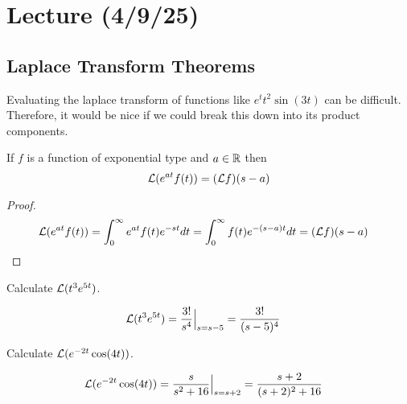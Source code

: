 \documentclass[notes]{subfiles}
\begin{document}
\setcounter{section}{18}
\section{Lecture (4/9/25)}

\subsection{Laplace Transform Theorems}
Evaluating the laplace transform of functions like $e^t t^2 \sin(3t)$ can be difficult. Therefore, it would be nice if we could break this down into its product components.

\begin{theorem} \label{first_translation_theorem}
    If $f$ is a function of exponential type and $a \in \mathbb{R}$ then
    \[
        \mathcal{L}(e^{at}f(t)) = (\mathcal{L} f)(s - a)
    \]
\end{theorem}
\begin{proof}
    \begin{align*}
        \mathcal{L}(e^{at}f(t))
        &= \int_0^\infty e^{at}f(t)e^{-st}dt
        = \int_0^\infty f(t)e^{-(s - a)t}dt
        = (\mathcal{L} f)(s - a)
    \end{align*}
\end{proof}

\begin{exercise}
    Calculate $\mathcal{L}(t^3e^{5t})$.
\end{exercise}
\begin{solution}
    \begin{align*}
        \mathcal{L}(t^3e^{5t})
        &= \frac{3!}{s^4}\Big|_{s = s - 5}
        = \frac{3!}{(s - 5)^4}
    \end{align*}
\end{solution}

\begin{exercise}
    Calculate $\mathcal{L}(e^{-2t}\cos(4t))$.
\end{exercise}
\begin{solution}
    \begin{align*}
        \mathcal{L}(e^{-2t}\cos(4t))
        &= \frac{s}{s^2 + 16}\Big|_{s = s + 2}
        = \frac{s + 2}{(s + 2)^2 + 16}
    \end{align*}
\end{solution}
\end{document}
